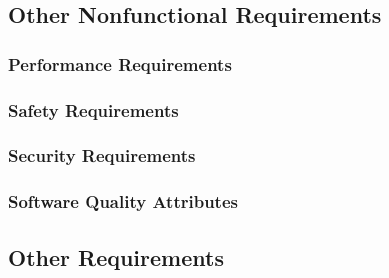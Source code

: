\pagebreak

\subsection{ Other Nonfunctional Requirements}
\subsubsection{Performance Requirements}
\subsubsection{ Safety Requirements}
\subsubsection{ Security Requirements}
\subsubsection{ Software Quality Attributes}

\subsection{ Other Requirements}
